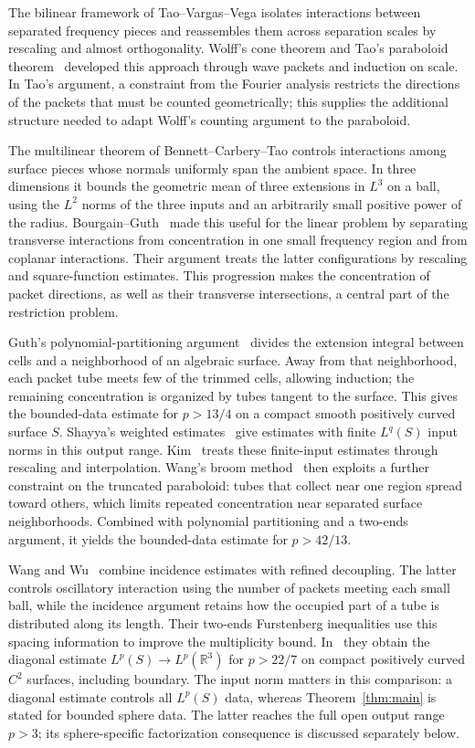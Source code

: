 The bilinear framework of Tao--Vargas--Vega
\cite{TaoVargasVega1998} isolates interactions between separated
frequency pieces and reassembles them across separation scales by
rescaling and almost orthogonality. Wolff's cone theorem
\cite{Wolff2001} and Tao's paraboloid theorem~\cite{Tao2003}
developed this approach through wave packets and induction on scale.
In Tao's argument, a constraint from the Fourier analysis restricts
the directions of the packets that must be counted geometrically;
this supplies the additional structure needed to adapt Wolff's
counting argument to the paraboloid.

The multilinear theorem of Bennett--Carbery--Tao
\cite{BennettCarberyTao2006} controls interactions among surface
pieces whose normals uniformly span the ambient space. In three
dimensions it bounds the geometric mean of three extensions in
\(L^3\) on a ball, using the \(L^2\) norms of the three inputs and
an arbitrarily small positive power of the radius.
Bourgain--Guth~\cite{BourgainGuth2011} made this useful for the
linear problem by separating transverse interactions from
concentration in one small frequency region and from coplanar
interactions. Their argument treats the latter configurations by
rescaling and square-function estimates. This progression makes
the concentration of packet directions, as well as their
transverse intersections, a central part of the restriction problem.

Guth's polynomial-partitioning argument~\cite{Guth2016} divides the
extension integral between cells and a neighborhood of an algebraic
surface. Away from that neighborhood, each packet tube meets few of the
trimmed cells, allowing induction; the remaining concentration is
organized by tubes tangent to the surface. This gives the bounded-data
estimate for $p>13/4$ on a compact smooth positively curved surface $S$.
Shayya's weighted estimates~\cite{Shayya2017} give estimates with finite
$L^q(S)$ input norms in this output range. Kim~\cite{Kim2017} treats
these finite-input estimates through rescaling and interpolation. Wang's broom
method~\cite{Wang2022Brooms} then exploits a further constraint on the
truncated paraboloid: tubes that collect near one region spread toward
others, which limits repeated concentration near separated surface
neighborhoods. Combined with polynomial partitioning and a two-ends
argument, it yields the bounded-data estimate for $p>42/13$.

Wang and Wu~\cite{WangWu2022,WangWu2024} combine incidence estimates
with refined decoupling. The latter controls oscillatory interaction
using the number of packets meeting each small ball, while the incidence
argument retains how the occupied part of a tube is distributed along
its length. Their two-ends Furstenberg inequalities use this spacing
information to improve the multiplicity bound. In~\cite[Theorem~0.2]{WangWu2024}
they obtain the diagonal estimate
$L^p(S)\to L^p(\mathbb R^3)$ for $p>22/7$ on compact positively curved
$C^2$ surfaces, including boundary. The input norm matters in this
comparison: a diagonal estimate controls all $L^p(S)$ data, whereas
Theorem~\ref{thm:main} is stated for bounded sphere data. The latter
reaches the full open output range $p>3$; its sphere-specific
factorization consequence is discussed separately below.

